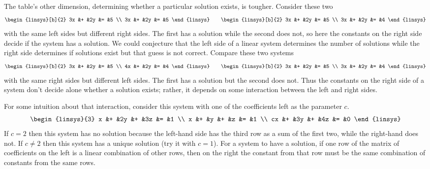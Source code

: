 The table's other dimension, 
determining whether a particular solution exists, is tougher.
Consider these two
\begin{equation*}
  \begin{linsys}[b]{2}
    3x &+ &2y &= &5  \\
    3x &+ &2y &= &5
  \end{linsys}
  \qquad
  \begin{linsys}[b]{2}
    3x &+ &2y &= &5  \\
    3x &+ &2y &= &4
  \end{linsys}
\end{equation*}
with the same left sides but different right sides.
The first has a solution while the second does not, so
here the constants on the right side decide if the system has a solution.
We could conjecture that the left side of a linear system determines
the number of solutions while the right side determines if solutions
exist but that guess is not correct.
Compare these two systems
\begin{equation*}
  \begin{linsys}[b]{2}
    3x &+ &2y &= &5  \\
    4x &+ &2y &= &4
  \end{linsys}
  \qquad
  \begin{linsys}[b]{2}
    3x &+ &2y &= &5  \\
    3x &+ &2y &= &4
  \end{linsys}
\end{equation*}
with the same right sides but different left sides.
The first has a solution but the second does not.
Thus the constants on the right side of a system 
don't decide alone whether a solution exists;
rather, it depends on some interaction between the left and
right sides.

For some intuition about that interaction,
consider this system with one of the coefficients left as the 
parameter $c$.
\begin{equation*}
  \begin{linsys}{3}
    x  &+  &2y  &+  &3z  &=  &1  \\
    x  &+  &y   &+  &z   &=  &1  \\
   cx  &+  &3y  &+  &4z  &=  &0
  \end{linsys}
\end{equation*}
If \( c=2 \) then this system has no solution because the left-hand side 
has the third row as a sum of the first two, while the right-hand does not.
If \( c\neq 2 \) then this system has a unique solution (try it with \( c=1 \)).
For a system to have a solution, if one row of the matrix of coefficients on
the left is a linear combination of other rows,
then on the right the constant from that row must be the same
combination of constants from the same rows.

